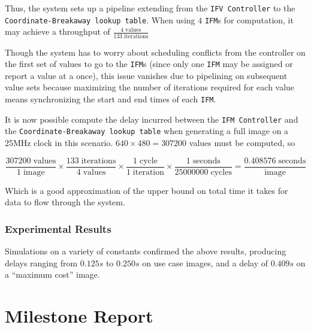 \documentclass{article}
\begin{document}
Thus, the system sets up a pipeline extending from the \texttt{IFV Controller} to the \texttt{Coordinate-Breakaway lookup table}. When using $4$ \texttt{IFM}s for computation, it may achieve a throughput of $\frac{4\; \text{values}}{133\; \text{iterations}}$ 

Though the system has to worry about
scheduling conflicts from the controller on the first set of values to go to the \texttt{IFM}s (since only one \texttt{IFM} may be assigned or report a value at a once), this issue vanishes due to pipelining on subsequent value sets because maximizing the number of iterations required for each value means synchronizing the start and end times of each \texttt{IFM}.

It is now possible compute the delay incurred between the \texttt{IFM Controller} and the \texttt{Coordinate-Breakaway lookup table} when generating a full image on a 25MHz clock in this scenario. $640 \times 480 = 307200$ values must be computed, so

$$
\frac{307200\; \text{values}}{1\; \text{image}} \times \frac{133 \;\text{iterations}}{4 \;\text{values}} \times \frac{1 \;\text{cycle}}{1 \;\text{iteration}} \times \frac{1 \;\text{seconds}}{25000000 \;\text{cycles}} = \frac{0.408576 \;\text{seconds}}{\text{image}}
$$

Which is a good approximation of the upper bound on total time it takes for data to flow through the system.

\subsubsection{Experimental Results}

Simulations on a variety of constants confirmed the above results, producing delays ranging from $0.125s$ to $0.250s$ 
on use case images, and a delay of $0.409s$ on a ``maximum cost'' image. 

\section{Milestone Report}
\end{document}
